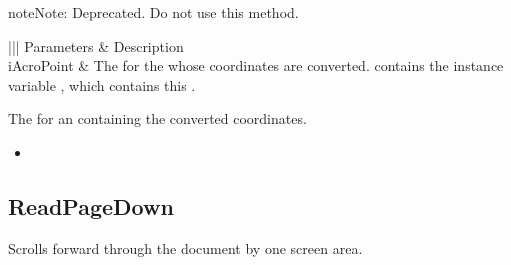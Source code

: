 \documentclass[letterpaper,12pt,english,openany,oneside]{sphinxmanual}
\begin{document}
\begin{sphinxadmonition}{note}{Note:}
Deprecated. Do not use this method.
\end{sphinxadmonition}


\begin{sphinxVerbatim}[commandchars=\\\{\}]
  
\end{sphinxVerbatim}
\label{\detokenize{IAC_API_OLE_Objects:parameters-35}}


\begin{savenotes}\sphinxattablestart
\centering
{}\label{\detokenize{IAC_API_OLE_Objects:section-39}}\nobreak
\begin{tabular}[t]{|||}
\hline
\sphinxstyletheadfamily 
Parameters
&\sphinxstyletheadfamily 
Description
\\
\hline
iAcroPoint
&
The  for the  whose coordinates are converted.  contains the instance variable , which contains this .
\\
\hline
\end{tabular}
\par
\sphinxattableend\end{savenotes}


The  for an  containing the converted coordinates.

\label{\detokenize{IAC_API_OLE_Objects:related-methods-60}}
\begin{itemize}
\item {} 
 

\end{itemize}




\subsection{ReadPageDown}
\label{\detokenize{IAC_API_OLE_Objects:readpagedown}}
Scrolls forward through the document by one screen area.
\end{document}
